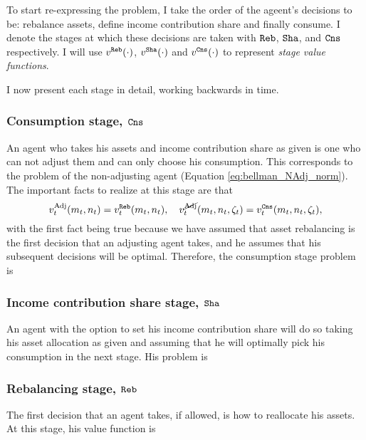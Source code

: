 \documentclass[./RiskyContrib.tex]{subfiles}
\begin{document}
To start re-expressing the problem, I take the order of the ageent's decisions to be:
rebalance assets, define income contribution share and finally consume. I denote the stages
at which these decisions are taken with $\mathtt{Reb}$, $\mathtt{Sha}$, and $\mathtt{Cns}$ respectively. I will use
$v^{\mathtt{Reb}}(\cdot)$, $v^{\mathtt{Sha}}(\cdot)$ and $v^{\mathtt{Cns}}(\cdot)$ to represent
\emph{stage value functions}.

I now present each stage in detail, working backwards in time.

\subsubsection{Consumption stage, $\mathtt{Cns}$}

An agent who takes his assets and income contribution share as given is one who
can not adjust them and can only choose his consumption. This corresponds to the
problem of the non-adjusting agent (Equation \ref{eq:bellman_NAdj_norm}). The
important facts to realize at this stage are that
\begin{equation*}
v_t^{\text{Adj}}(m_t, n_t) = v_t^{\mathtt{Reb}}(m_t, n_t), \quad v_t^{\cancel{\text{Adj}}}(m_t, n_t, \zeta_t) = v_t^{\mathtt{Cns}}(m_t, n_t, \zeta_t),
\end{equation*}
with the first fact being true because we have assumed that asset rebalancing
is the first decision that an adjusting agent takes, and he assumes that his
subsequent decisions will be optimal. Therefore, the consumption stage problem is
\begin{equation*}

\end{equation*}

\subsubsection{Income contribution share stage, $\mathtt{Sha}$}

An agent with the option to set his income contribution share will do so
taking his asset allocation as given and assuming that he will optimally
pick his consumption in the next stage. His problem is
\begin{equation*}

\end{equation*}

\subsubsection{Rebalancing stage, $\mathtt{Reb}$}

The first decision that an agent takes, if allowed, is how to reallocate his
assets. At this stage, his value function is
\begin{equation*}

\end{equation*}
\end{document}
